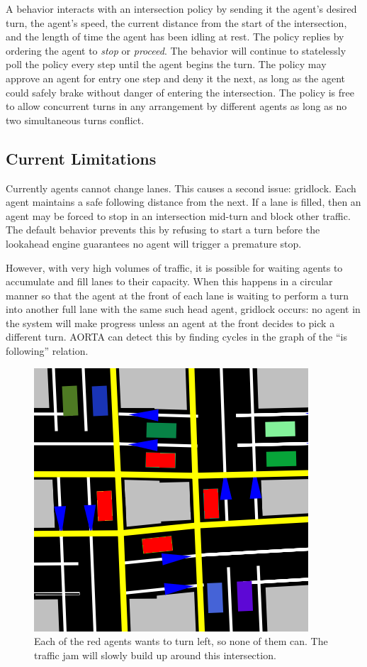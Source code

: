 \documentclass[letterpaper, 10 pt, conference]{ieeeconf}  %
\begin{document}
A behavior interacts with an intersection policy by sending it the agent's
desired turn, the agent's speed, the current distance from the start of the
intersection, and the length of time the agent has been idling at rest. The
policy replies by ordering the agent to \textit{stop} or \textit{proceed}. The behavior
will continue to statelessly poll the policy every step until the agent begins
the turn. The policy may approve an agent for entry one step and deny it the
next, as long as the agent could safely brake without danger of entering the
intersection. The policy is free to allow concurrent turns in any arrangement by
different agents as long as no two simultaneous turns conflict.

\subsection{Current Limitations}

Currently agents cannot change lanes. This causes a second issue: gridlock.
Each agent maintains a safe following distance from the next. If a lane is
filled, then an agent may be forced to stop in an intersection mid-turn and
block other traffic. The default behavior prevents this by refusing to start a
turn before the lookahead engine guarantees no agent will trigger a premature
stop.

However, with very high volumes of traffic, it is possible for waiting agents to
accumulate and fill lanes to their capacity. When this happens in a circular
manner so that the agent at the front of each lane is waiting to perform a turn
into another full lane with the same such head agent, gridlock \cite{AAAI11-au}
occurs: no agent in the system will make progress unless an agent at the front
decides to pick a different turn.  AORTA can detect this by finding cycles in
the graph of the ``is following'' relation.

\begin{figure}[h]
  \centering \includegraphics[scale=0.25]{gridlock.png}
  \caption{Each of the red agents wants to turn left, so none of them
           can. The traffic jam will slowly build up around this intersection.}
  \label{fig:gridlock}
  \vspace{-10pt}
\end{figure}
\end{document}
